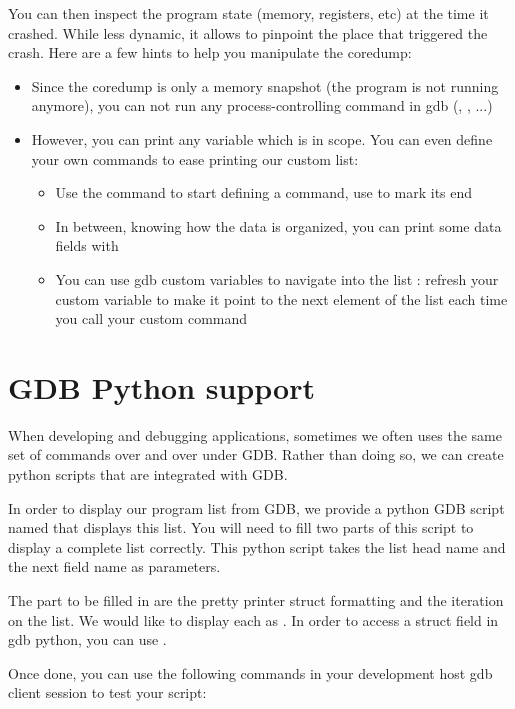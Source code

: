 You can then inspect the program state (memory, registers, etc) at the time it
crashed. While less dynamic, it allows to pinpoint the place that triggered the
crash. Here are a few hints to help you manipulate the coredump:
\begin{itemize}
  \item Since the coredump is only a memory snapshot (the program is not
  running anymore), you can not run any process-controlling command in gdb
  (, , ...)
  \item However, you can print any variable which is in scope. You can even
  define your own commands to ease printing our custom list:
  \begin{itemize}
    \item Use the  command to start defining a command, use
     to mark its end
    \item In between, knowing how the data is organized, you can print some
    data fields with 
    \item You can use gdb custom variables to navigate into the list : refresh
    your custom variable to make it point to the next element of the list each
    time you call your custom command
  \end{itemize}
\end{itemize}

\section{GDB Python support}

When developing and debugging applications, sometimes we often uses the same
set of commands over and over under GDB. Rather than doing so, we can create
python scripts that are integrated with GDB.

In order to display our program list from GDB, we provide a python GDB script
named  that displays this list. You will need to fill two
parts of this script to display a complete list correctly. This python script
takes the list head name and the next field name as parameters.

The part to be filled in are the pretty printer struct formatting and the
iteration on the list. We would like to display each  as
. In order to access a struct field in gdb python, you can use
.

Once done, you can use the following commands in your development host gdb
client session to test your script:

